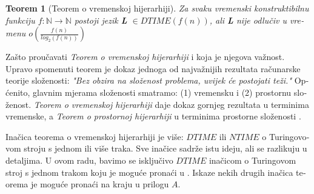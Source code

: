 \documentclass[12pt]{rectors}
\newtheorem{theorem}{Teorem}[section]
\begin{document}
\begin{otherlanguage}{croatian}

\begin{theorem}[Teorem o vremenskoj hijerarhiji]
\label{timehierarhy}
Za svaku vremenski konstruktibilnu funkciju $f : \mathbb{N} \to \mathbb{N}$ postoji jezik \textbf{L} $\in DTIME(f\left ( n \right ) )$, ali \textbf{L} nije odlučiv 
u vremenu $o(\frac {f\left ( n \right )}{log_2\left ( f\left ( n \right ) \right )} )$
\end{theorem}

Zašto proučavati \textit{Teorem o vremenskoj hijerarhiji} i koja je njegova važnost. Upravo spomenuti teorem je dokaz jednoga od najvažnijih rezultata računarske teorije složenosti: \textit{"Bez obzira na složenost problema, uvijek će postojati teži."}
Općenito, glavnim mjerama složenosti smatramo: (1) vremensku i (2) prostornu složenost.
\textit{Teorem o vremenskoj hijerarhiji} daje dokaz gornjeg rezultata u terminima vremenske, a \textit{Teorem o prostornoj hijerarhiji} u terminima prostorne složenosti \cite{sipser2006}.

Inačica teorema o vremenskoj hijerarhiji je više: $DTIME$ ili $NTIME$ o Turingovovom stroju s jednom ili više traka.
Sve inačice sadrže istu ideju, ali se razlikuju u detaljima.
U ovom radu, bavimo se isključivo $DTIME$ inačicom o Turingovom stroj s jednom trakom koju je moguće pronaći u \cite{sipser2006}. 
Iskaze nekih drugih inačica teorema je moguće pronaći na kraju u prilogu $A$.


\end{otherlanguage}
\end{document}
